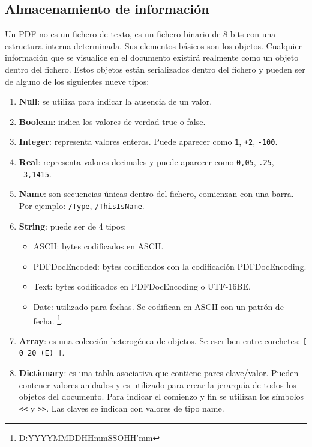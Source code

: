 
\subsection{Almacenamiento de información}

Un PDF no es un fichero de texto, es un fichero binario de 8 bits con una estructura interna determinada. Sus elementos básicos son los objetos. Cualquier información que se visualice en el documento existirá realmente como un objeto dentro del fichero. Estos objetos están serializados dentro del fichero y pueden ser de alguno de los siguientes nueve tipos:

\begin{enumerate}
    \item \textbf{Null}: se utiliza para indicar la ausencia de un valor.
    \item \textbf{Boolean}: indica los valores de verdad true o false.
    \item \textbf{Integer}: representa valores enteros. Puede aparecer como \verb|1|, \verb|+2|, \verb|-100|.
    \item \textbf{Real}: representa valores decimales y puede aparecer como \verb|0,05|, \verb|.25|, \verb|-3,1415|.
    \item \textbf{Name}: son secuencias únicas dentro del fichero, comienzan con una barra. Por ejemplo: \verb|/Type|, \verb|/ThisIsName|.
    \item \textbf{String}: puede ser de 4 tipos:
    \begin{itemize}
        \item ASCII: bytes codificados en ASCII.
        \item PDFDocEncoded: bytes codificados con la codificación PDFDocEncoding.
        \item Text: bytes codificados en PDFDocEncoding o UTF-16BE.
        \item Date: utilizado para fechas. Se codifican en ASCII con un patrón de fecha. \footnote{D:YYYYMMDDHHmmSSOHH’mm}.
    \end{itemize}
    \item \textbf{Array}: es una colección heterogénea de objetos. Se escriben entre corchetes: \verb|[ 0 20 (E) ]|.
    \item \textbf{Dictionary}: es una tabla asociativa que contiene pares clave/valor. Pueden contener valores anidados y es utilizado para crear la jerarquía de todos los objetos del documento. Para indicar el comienzo y fin se utilizan los símbolos \verb|<<| y \verb|>>|. Las claves se indican con valores de tipo name.

\end{enumerate}
